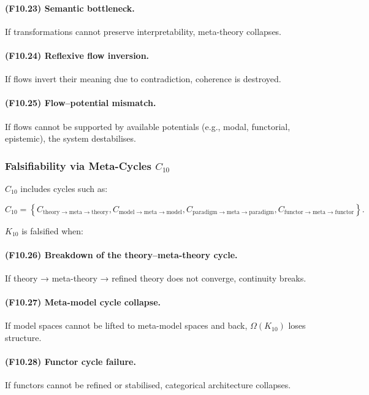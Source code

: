 \paragraph{(F10.23) Semantic bottleneck.}
If transformations cannot preserve interpretability,
meta-theory collapses.

\paragraph{(F10.24) Reflexive flow inversion.}
If flows invert their meaning due to contradiction,
coherence is destroyed.

\paragraph{(F10.25) Flow–potential mismatch.}
If flows cannot be supported by available potentials
(e.g., modal, functorial, epistemic),
the system destabilises.



\subsubsection{Falsifiability via Meta-Cycles $C_{10}$}

$C_{10}$ includes cycles such as:

\[
C_{10} =
\left\{
C_{\mathrm{theory\to meta\to theory}},
C_{\mathrm{model\to meta\to model}},
C_{\mathrm{paradigm\to meta\to paradigm}},
C_{\mathrm{functor\to meta\to functor}}
\right\}.
\]

$K_{10}$ is falsified when:

\paragraph{(F10.26) Breakdown of the theory–meta-theory cycle.}
If theory → meta-theory → refined theory does not converge,
continuity breaks.

\paragraph{(F10.27) Meta-model cycle collapse.}
If model spaces cannot be lifted to meta-model spaces and back,
$\Omega(K_{10})$ loses structure.

\paragraph{(F10.28) Functor cycle failure.}
If functors cannot be refined or stabilised,
categorical architecture collapses.

